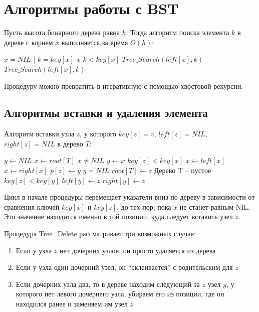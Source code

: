 \documentclass[11pt]{article}
\begin{document}
\section{Алгоритмы работы с BST}
Пусть высота бинарного дерева равна $h$. Тогда алгоритм поиска элемента $k$ в дереве с корнем $x$ выполняется за время $O(h)$:
\begin{codebox}
\li \If $x = NIL$ | $k = key[x]$
\li \Then \Return $x$
\End
\li \If $k < key[x]$
\li \Then \Return $Tree\_Search(left[x], k)$
\li \Else \Return $Tree\_Search(left[x], k)$
\End
\end{codebox}
Процедуру можно превратить в итеративную с помощью хвостовой рекурсии.

\subsection{Алгоритмы вставки и удаления элемента}
Алгоритм вставки узла $z$, у которого $key[z] = v$, $left[z] = NIL$, $right[z] = NIL$ в дерево $T$:
\begin{codebox}
\li $y \gets NIL$
\li $x \gets root[T]$
\li \While $x \neq NIL$
\li   \Do $y \gets x$
\li     \If $key[z] < key[x]$
\li       \Then $x \gets left[x]$
\li       \Else $x \gets right[x]$
  \End
\End
\li $p[z] \gets y$
\li \If $y = NIL$
\li   \Then $root[T] \gets z$ \Comment Дерево T -- пустое
\li   \Else \If $key[z] < key[y]$
\li       \Then $left[y] \gets z$
\li       \Else $right[y] \gets z$
  \End
\End
\end{codebox}

Цикл в начале процедуры перемещает указатели вниз по дереву в зависимости от сравнения ключей $key[x]$ и $key[z]$, до тех пор, пока $x$ не станет равным NIL. Это значение находится именно в той позиции, куда следует вставить узел $z$.

Процедура Tree\_Delete рассматривает три возможных случая:
\begin{enumerate}
\item Если у узла $z$ нет дочерних узлов, он просто удаляется из дерева
\item Если у узла один дочерний узел, он ``склеивается'' с родительским для $z$
\item Если дочерних узла два, то в дереве находим следующий за $z$ узел $y$, у которого нет левого дочернего узла, убираем его из позиции, где он находился ранее и заменяем им узел $z$
\end{enumerate}
\end{document}
